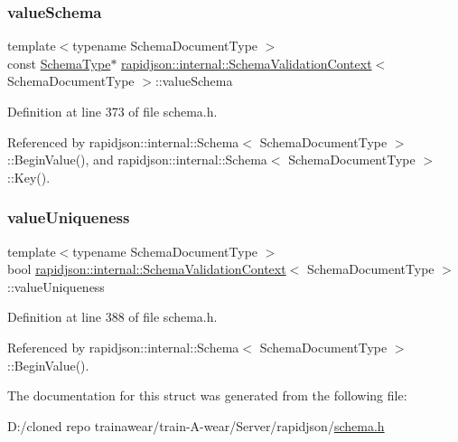 \subsubsection{\texorpdfstring{valueSchema}{valueSchema}}
{\footnotesize\ttfamily template$<$typename Schema\+Document\+Type $>$ \\
const \mbox{\hyperlink{structrapidjson_1_1internal_1_1_schema_validation_context_ae7fc7012fdcdb1b0141b73842c814644}{Schema\+Type}}$\ast$ \mbox{\hyperlink{structrapidjson_1_1internal_1_1_schema_validation_context}{rapidjson\+::internal\+::\+Schema\+Validation\+Context}}$<$ Schema\+Document\+Type $>$\+::value\+Schema}



Definition at line 373 of file schema.\+h.



Referenced by rapidjson\+::internal\+::\+Schema$<$ Schema\+Document\+Type $>$\+::\+Begin\+Value(), and rapidjson\+::internal\+::\+Schema$<$ Schema\+Document\+Type $>$\+::\+Key().

\mbox{\label{structrapidjson_1_1internal_1_1_schema_validation_context_a8b8495d77b512073f13ae4f7c6122b96}} 
\subsubsection{\texorpdfstring{valueUniqueness}{valueUniqueness}}
{\footnotesize\ttfamily template$<$typename Schema\+Document\+Type $>$ \\
bool \mbox{\hyperlink{structrapidjson_1_1internal_1_1_schema_validation_context}{rapidjson\+::internal\+::\+Schema\+Validation\+Context}}$<$ Schema\+Document\+Type $>$\+::value\+Uniqueness}



Definition at line 388 of file schema.\+h.



Referenced by rapidjson\+::internal\+::\+Schema$<$ Schema\+Document\+Type $>$\+::\+Begin\+Value().



The documentation for this struct was generated from the following file\+:\begin{DoxyCompactItemize}
\item 
D\+:/cloned repo trainawear/train-\/\+A-\/wear/\+Server/rapidjson/\mbox{\hyperlink{schema_8h}{schema.\+h}}\end{DoxyCompactItemize}
